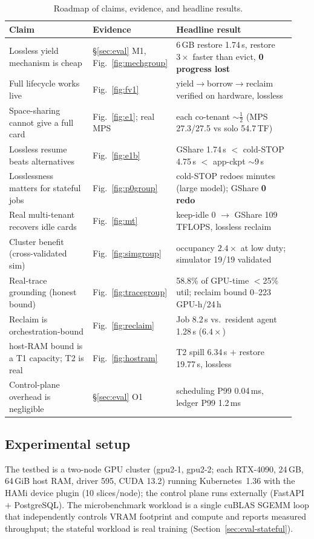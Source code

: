 \documentclass[preprint,12pt]{elsarticle}
\begin{document}
\begin{table}[t]\centering\small
\caption{Roadmap of claims, evidence, and headline results.}
\label{tab:results}
\begin{tabular}{@{}p{0.30\linewidth}p{0.20\linewidth}p{0.44\linewidth}@{}}
\toprule
Claim & Evidence & Headline result \\
\midrule
Lossless yield mechanism is cheap & \S\ref{sec:eval} M1, Fig.~\ref{fig:mechgroup} & 6\,GB restore 1.74\,s, restore $3\times$ faster than evict, \textbf{0 progress lost} \\
Full lifecycle works live & Fig.~\ref{fig:fv1} & yield$\rightarrow$borrow$\rightarrow$reclaim verified on hardware, lossless \\
Space-sharing cannot give a full card & Fig.~\ref{fig:e1}; real MPS & each co-tenant $\sim\frac{1}{2}$ (MPS 27.3/27.5 vs solo 54.7\,TF) \\
Lossless resume beats alternatives & Fig.~\ref{fig:e1b} & GShare 1.74\,s $<$ cold-STOP 4.75\,s $<$ app-ckpt $\sim$9\,s \\
Losslessness matters for stateful jobs & Fig.~\ref{fig:p0group} & cold-STOP redoes minutes (large model); GShare \textbf{0 redo} \\
Real multi-tenant recovers idle cards & Fig.~\ref{fig:mt} & keep-idle 0 $\rightarrow$ GShare 109\,TFLOPS, lossless reclaim \\
Cluster benefit (cross-validated sim) & Fig.~\ref{fig:simgroup} & occupancy $2.4\times$ at low duty; simulator 19/19 validated \\
Real-trace grounding (honest bound) & Fig.~\ref{fig:tracegroup} & 58.8\% of GPU-time $<$25\% util; reclaim bound 0--223 GPU-h/24\,h \\
Reclaim is orchestration-bound & Fig.~\ref{fig:reclaim} & Job 8.2\,s vs.\ resident agent 1.28\,s ($6.4\times$) \\
host-RAM bound is a T1 capacity; T2 is real & Fig.~\ref{fig:hostram} & T2 spill 6.34\,s $+$ restore 19.77\,s, lossless \\
Control-plane overhead is negligible & \S\ref{sec:eval} O1 & scheduling P99 0.04\,ms, ledger P99 1.2\,ms \\
\bottomrule
\end{tabular}
\end{table}

\subsection{Experimental setup}
The testbed is a two-node GPU cluster (gpu2-1, gpu2-2; each RTX-4090, 24\,GB, 64\,GiB host RAM, driver
595, CUDA 13.2) running Kubernetes~1.36 with the HAMi device plugin (10 slices/node); the control plane
runs externally (FastAPI $+$ PostgreSQL). The microbenchmark workload is a single cuBLAS SGEMM loop that
independently controls VRAM footprint and compute and reports measured throughput; the stateful workload
is real training (Section~\ref{sec:eval-stateful}).
\end{document}
